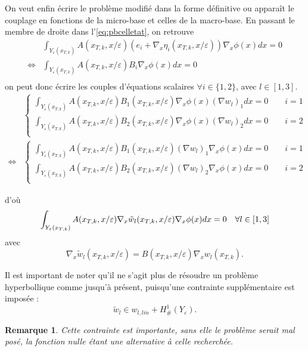 \documentclass[11pt]{article}
\newtheorem{rmq}{Remarque}
\newcommand{\Ye}{Y_\varepsilon}
\newcommand{\tw}{\tilde{w}}
\newcommand{\Hd}{H^1_{\#}}
\newcommand{\xtk}{x_{T,k}}
\begin{document}
On veut enfin écrire le problème modifié dans la forme définitive ou apparaît le couplage en fonctions de la micro-base et celles de la macro-base.
En passant le membre de droite dans l'\autoref{eq:pbcelletat}, on retrouve
\begin{equation}
  \begin{aligned}
    &\int_{\Ye(\xtk)} A(\xtk, x/\varepsilon)(e_i + \nabla_x \eta_i(\xtk, x/\varepsilon)) \nabla_x \phi(x) dx = 0 \\
    \iff &\int_{\Ye(\xtk)} A(\xtk, x/\varepsilon)B_i \nabla_x \phi(x) dx = 0 \\
  \end{aligned}
\end{equation}
on peut donc écrire les couples d'équations scalaires $\forall i\in \{1,2\}$, avec $l\in [1, 3]$.
\begin{equation}
  \begin{aligned}
    &\begin{cases}
      \int_{\Ye(\xtk)} A(\xtk, x/\varepsilon) B_1(\xtk, x/\varepsilon) \nabla_x \phi(x) (\nabla w_l)_1 dx = 0 \qquad i = 1 \\
      \int_{\Ye(\xtk)} A(\xtk, x/\varepsilon) B_2(\xtk, x/\varepsilon) \nabla_x \phi(x) (\nabla w_l)_2 dx = 0 \qquad i = 2 \\ 
    \end{cases}  \\                     
    \iff &\begin{cases}                          
      \int_{\Ye(\xtk)} A(\xtk, x/\varepsilon) B_1(\xtk, x/\varepsilon) (\nabla w_l)_1 \nabla_x \phi(x) dx = 0 \qquad i = 1 \\
      \int_{\Ye(\xtk)} A(\xtk, x/\varepsilon) B_2(\xtk, x/\varepsilon) (\nabla w_l)_2 \nabla_x \phi(x) dx = 0 \qquad i = 2 \\ 
    \end{cases} 
  \end{aligned}
\end{equation}

d'où 
\begin{equation}
  \label{eq:pbcelltw}
  \int_{\Ye(\xtk)} A(\xtk, x/\varepsilon)\nabla_x \tw_l(\xtk, x/\varepsilon) \nabla_x \phi(x) dx = 0 \quad \forall l \in [1, 3]\\
\end{equation}
avec
\[
  \nabla_x \tw_l(\xtk, x/\varepsilon) = B(\xtk, x/\varepsilon) \nabla_x w_l(\xtk).
\]

Il est important de noter qu'il ne s'agit plus de résoudre un problème hyperbollique comme jusqu'à présent, puisqu'une contrainte supplémentaire est
imposée :
\[
  \tw_l \in w_{l, lin} + \Hd(\Ye).
\]
\begin{rmq}
  Cette contrainte est importante, sans elle le problème serait mal posé, la fonction nulle étant une alternative à celle recherchée.
\end{rmq}
\end{document}
